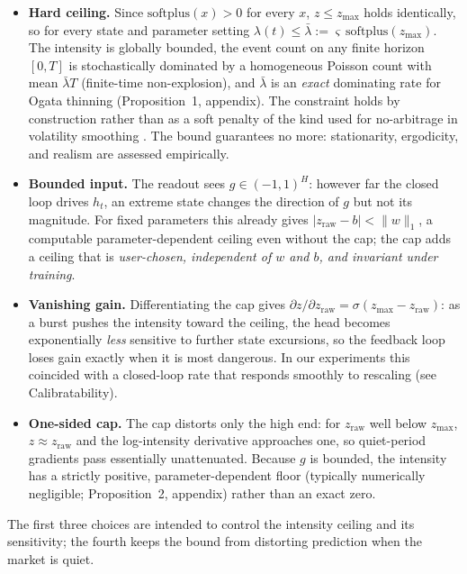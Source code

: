 \begin{itemize}
\item \textbf{Hard ceiling.} Since $\mathrm{softplus}(x)>0$ for every $x$,
  $z\le z_{\max}$ holds identically, so for every state and parameter
  setting $\lambda(t)\le\bar\lambda:=\varsigma\,\mathrm{softplus}(z_{\max})$.
  The intensity is globally bounded, the event count on any finite horizon
  $[0,T]$ is stochastically dominated by a homogeneous Poisson count with
  mean $\bar\lambda T$ (finite-time non-explosion), and $\bar\lambda$ is an
  \emph{exact} dominating rate for Ogata thinning (Proposition~1, appendix).
  The constraint holds by construction rather than as a soft penalty of the
  kind used for no-arbitrage in volatility smoothing
  \citep{wiedemann2025opds}.
  The bound guarantees no more: stationarity, ergodicity, and realism are
  assessed empirically.
\item \textbf{Bounded input.} The readout sees $g\in(-1,1)^H$: however far
  the closed loop drives $h_t$, an extreme state changes the direction of
  $g$ but not its magnitude. For fixed parameters this already gives
  $|z_{\mathrm{raw}}-b|<\lVert w\rVert_1$, a computable parameter-dependent
  ceiling even without the cap; the cap adds a ceiling that is
  \emph{user-chosen, independent of $w$ and $b$, and invariant under
  training}.
\item \textbf{Vanishing gain.} Differentiating the cap gives
  $\partial z/\partial z_{\mathrm{raw}} = \sigma(z_{\max}-z_{\mathrm{raw}})$:
  as a burst pushes the intensity toward the ceiling, the head becomes
  exponentially \emph{less} sensitive to further state excursions, so the
  feedback loop loses gain exactly when it is most dangerous. In our
  experiments this coincided with a closed-loop rate that responds smoothly
  to rescaling (see Calibratability).
\item \textbf{One-sided cap.} The cap distorts only the high end: for
  $z_{\mathrm{raw}}$ well below $z_{\max}$, $z\approx z_{\mathrm{raw}}$ and
  the log-intensity derivative approaches one, so quiet-period gradients
  pass essentially unattenuated. Because $g$ is bounded, the intensity has a
  strictly positive, parameter-dependent floor (typically numerically
  negligible; Proposition~2, appendix) rather than an exact zero.
\end{itemize}
The first three choices are intended to control the intensity ceiling and
its sensitivity; the fourth keeps the bound from distorting prediction when
the market is quiet.

